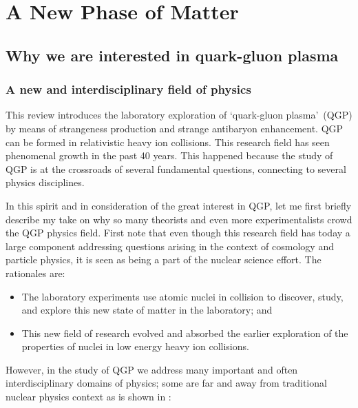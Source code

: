 {\protect\markboth{\contentsname}{\contentsname}}
\setcounter{tocdepth}{3}
\tableofcontents
\vfill\newpage

\section{A New Phase of Matter}
\subsection{Why we are interested in quark-gluon plasma}
\subsubsection{A new and interdisciplinary field of physics}

This review introduces the laboratory exploration of \lq quark-gluon plasma\rq\ (QGP) by means of strangeness production and strange antibaryon enhancement. QGP can be formed in relativistic heavy ion collisions. This research field has seen phenomenal growth in the past 40 years. This happened because the study of QGP is at the crossroads of several fundamental questions, connecting to several physics disciplines. 

In this spirit and in consideration of the great interest in QGP, let me first briefly describe my take on why so many theorists and even more experimentalists crowd the QGP physics field. First note that even though this research field has today a large component addressing questions arising in the context of cosmology and particle physics, it is seen as being a part of the nuclear science effort. The rationales are:
\begin{itemize}
\item
The laboratory experiments use atomic nuclei in collision to discover, study, and explore this new state of matter in the laboratory; and
\item
This new field of research evolved and absorbed the earlier exploration of the properties of nuclei in low energy heavy ion collisions. 
\end{itemize}
However, in the study of QGP we address many important and often interdisciplinary domains of physics; some are far and away from traditional nuclear physics context as is shown in : 

